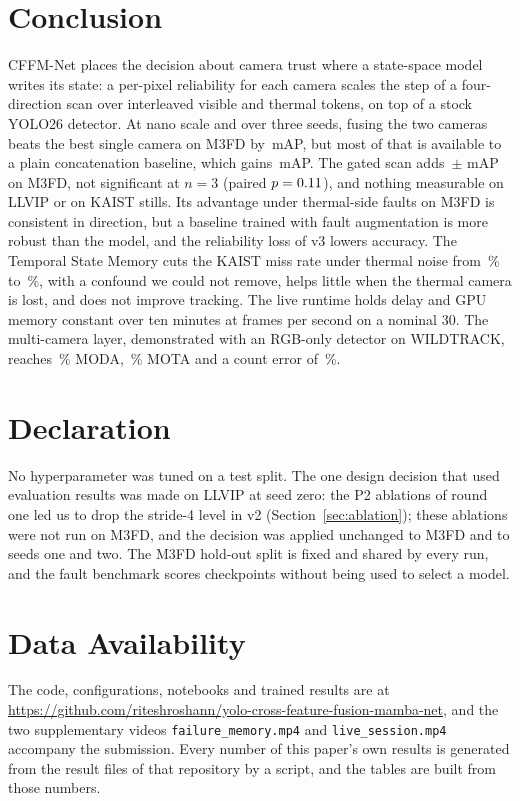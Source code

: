 \section{Conclusion}
\label{sec:conclusion}
CFFM-Net places the decision about camera trust where a state-space model writes its state: a per-pixel reliability for each camera scales the step of a four-direction scan over interleaved visible and thermal tokens, on top of a stock YOLO26 detector. At nano scale and over three seeds, fusing the two cameras beats the best single camera on M3FD by \gainMfdCffmVtwoOverBestMeanMap{}\,mAP, but most of that is available to a plain concatenation baseline, which gains \gainMfdConcatMdOverBestMeanMap{}\,mAP. The gated scan adds \marMfdVtwoVsConcatMdMeanMap{}\,$\pm$\,\marMfdVtwoVsConcatMdStdMap{}\,mAP on M3FD, not significant at $n=3$ (paired $p=0.11{}$), and nothing measurable on LLVIP or on KAIST stills. Its advantage under thermal-side faults on M3FD is consistent in direction, but a baseline trained with fault augmentation is more robust than the model, and the reliability loss of v3 lowers accuracy. The Temporal State Memory cuts the KAIST miss rate under thermal noise from \memThermalNoiseImageAllMr{}\,\% to \memThermalNoiseMemoryAllMr{}\,\%, with a confound we could not remove, helps little when the thermal camera is lost, and does not improve tracking. The live runtime holds delay and GPU memory constant over ten minutes at \livSoakThirtyFps{} frames per second on a nominal 30. The multi-camera layer, demonstrated with an RGB-only detector on WILDTRACK, reaches \camDetFineTunedModa{}\,\% MODA, \camTrackMota{}\,\% MOTA and a count error of \camCountRelErr{}\,\%.

\section*{Declaration}
No hyperparameter was tuned on a test split. The one design decision that used evaluation results was made on LLVIP at seed zero: the P2 ablations of round one led us to drop the stride-4 level in v2 (Section~\ref{sec:ablation}); these ablations were not run on M3FD, and the decision was applied unchanged to M3FD and to seeds one and two. The M3FD hold-out split is fixed and shared by every run, and the fault benchmark scores checkpoints without being used to select a model.

\section*{Data Availability}
The code, configurations, notebooks and trained results are at \url{https://github.com/riteshroshann/yolo-cross-feature-fusion-mamba-net}, and the two supplementary videos \texttt{failure\_memory.mp4} and \texttt{live\_session.mp4} accompany the submission. Every number of this paper's own results is generated from the result files of that repository by a script, and the tables are built from those numbers.
